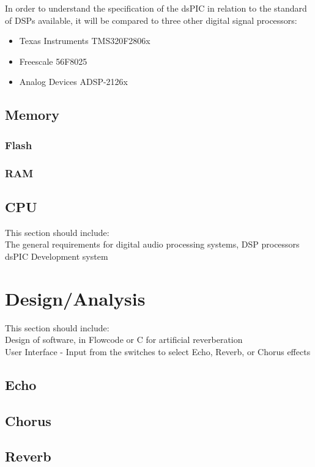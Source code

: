 \documentclass{scrartcl}
\begin{document}
    In order to understand the specification of the dsPIC in relation to the
    standard of DSPs available, it will be compared to three other digital signal
    processors:
    \begin{itemize}
        \item Texas Instruments TMS320F2806x
        \item Freescale 56F8025
        \item Analog Devices ADSP-2126x
    \end{itemize}
    \subsection{Memory}
    \subsubsection{Flash}
    \subsubsection{RAM}
    \subsection{CPU}



    This section should include:\\
        The general requirements for digital audio processing systems, DSP
        processors\\
        dsPIC Development system\\

    \section{Design/Analysis}
    This section should include:\\
        Design of software, in Flowcode or C for artificial reverberation\\
        User Interface - Input from the switches to select Echo, Reverb, or
        Chorus effects\\
        \subsection{Echo}
        \subsection{Chorus}
        \subsection{Reverb}
\end{document}
